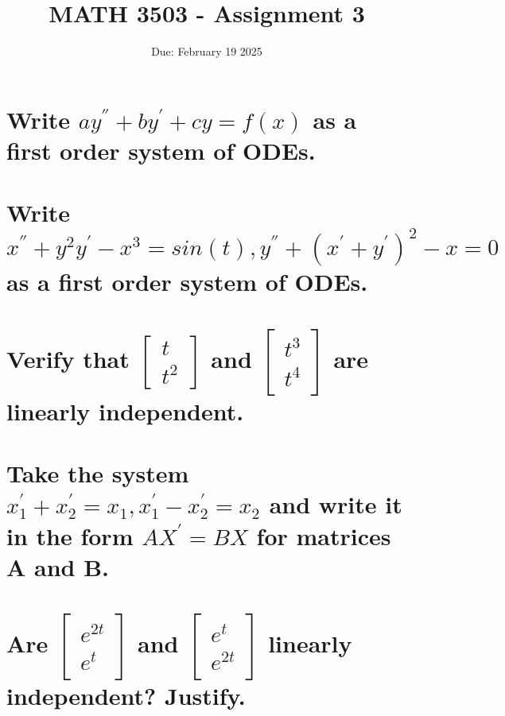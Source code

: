 \documentclass{article}
\title{MATH 3503 - Assignment 3}
\date{Due: February 19 2025}
\begin{document}
\maketitle

\section{Write $ay^{''} + by^{'} + cy = f(x)$ as a first order system of ODEs.}

\section{Write $x^{''} +y^2 y^{'} - x^3 = sin(t), y^{''} + (x^{'} + y^{'})^2 - x = 0$ as a first order system of ODEs.}

\section{Verify that $\begin{bmatrix} t \\ t^2 \end{bmatrix}$ and $\begin{bmatrix} t^3 \\ t^4 \end{bmatrix}$ are linearly independent.}

\section{Take the system $x^{'}_1 + x^{'}_2 = x_1, x^{'}_1 - x^{'}_2 = x_2$ and write it in the form $A X^{'} = B X$ for matrices A and B.}

\section{Are $\begin{bmatrix} e^{2t} \\ e^t \end{bmatrix}$ and $\begin{bmatrix} e^t \\ e^{2t} \end{bmatrix}$ linearly independent? Justify.}
\end{document}

